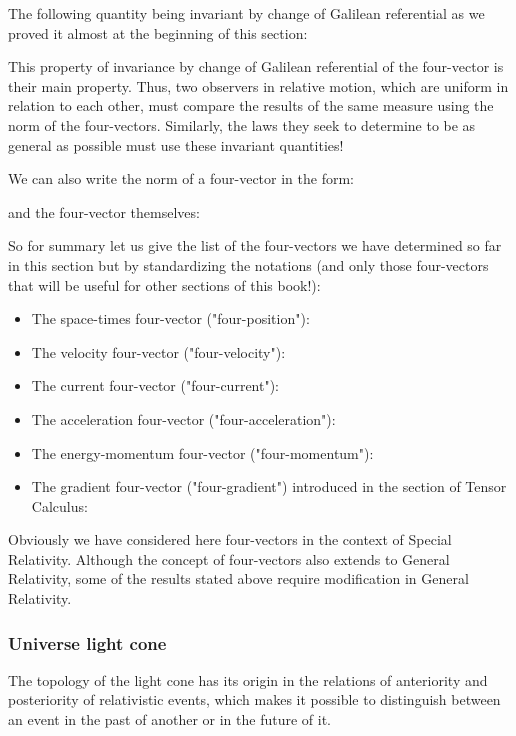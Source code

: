 	The following quantity being invariant by change of Galilean referential as we proved it almost at the beginning of this section:
	
	This property of invariance by change of Galilean referential of the four-vector is their main property. Thus, two observers in relative motion, which are uniform in relation to each other, must compare the results of the same measure using the norm of the four-vectors. Similarly, the laws they seek to determine to be as general as possible must use these invariant quantities! 
	
	We can also write the norm of a four-vector in the form:
	
	and the four-vector themselves:
	
	So for summary let us give the list of the four-vectors we have determined so far in this section but by standardizing the notations (and only those four-vectors that will be useful for other sections of this book!):
	\begin{itemize}
		\item The space-times four-vector ("four-position"):
		

		\item The velocity four-vector ("four-velocity"):
		
		
		\item The current four-vector ("four-current"):
		
		
		\item The acceleration four-vector ("four-acceleration"):
		
		
		\item The energy-momentum four-vector ("four-momentum"):
		

		\item The gradient four-vector ("four-gradient") introduced in the section of Tensor Calculus:
		
	\end{itemize}
	Obviously we have considered here four-vectors in the context of Special Relativity. Although the concept of four-vectors also extends to General Relativity, some of the results stated above require modification in General Relativity.
	
	\subsubsection{Universe light cone}
	The topology of the light cone has its origin in the relations of anteriority and posteriority of relativistic events, which makes it possible to distinguish between an event in the past of another or in the future of it.

